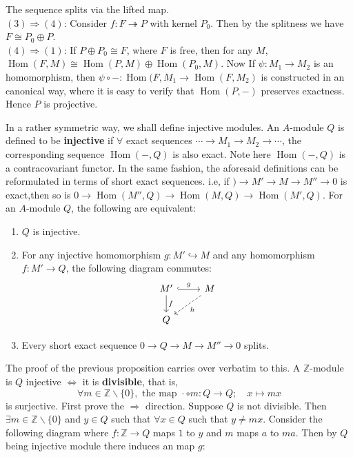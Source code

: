 \documentclass[12pt]{article}
\theoremstyle{definition}
\theoremstyle{plain}
\DeclareMathOperator{\Hom}{Hom}
\newcommand{\z}{\mathbb{Z}}
\newcommand{\inj}{\hookrightarrow}
\newcommand{\surj}{\twoheadrightarrow}
\begin{document}
The sequence splits via the lifted map.\\
$(3)\Rightarrow(4)$: Consider $f: F\surj P$ with kernel $P_0$. Then by the splitness we have $F\cong P_0\oplus P$.\\
$(4)\Rightarrow (1)$: If $P\oplus P_0\cong F$, where $F$ is free, then for any $M$, $\Hom(F, M)\cong \Hom(P, M)\oplus \Hom(P_0, M)$. Now If $\psi: M_1\to M_2$ is an homomorphism, then $\psi\circ -:\Hom(F, M_1\to \Hom(F, M_2)$ is constructed in an canonical way, where it is easy to verify that $\Hom(P, -)$ preserves exactness. Hence $P$ is projective.

\medskip
In a rather symmetric way, we shall define injective modules.
\Def An $A$-module $Q$ is defined to be \textbf{injective} if $\forall$ exact sequences $\cdots \to M_1\to M_2\to\cdots$, the corresponding sequence $\Hom(-, Q)$ is also exact. Note here $\Hom(-, Q)$ is a contracovariant functor.
\Rmk In the same fashion, the aforesaid definitions can be reformulated in terms of short exact sequences. i.e, if $)\to M'\to M\to M''\to 0$ is exact,then so is $0\to \Hom(M'', Q)\to \Hom(M, Q)\to \Hom(M', Q)$.
 For an $A$-module $Q$, the following are equivalent:
\begin{enumerate}
  \item $Q$ is injective.
  \item For any injective homomorphism $g: M'\inj M$ and any homomorphism $f: M'\to Q$, the following diagram commutes:
    \begin{equation}
      \begin{tikzcd}
        M'\ar{d}{f}\ar[hook]{r}{g} &M\ar[dashed]{ld}{h}\\
        Q
      \end{tikzcd}
    \end{equation}
  \item Every short exact sequence $0\to Q\to M\to M''\to 0$ splits.
\end{enumerate}
\proof The proof of the previous proposition carries over verbatim to this.
\Prop A $\z$-module is $Q$ injective $\iff$ it is \textbf{divisible}, that is, $$\forall m\in \z\backslash\{0\},\text{ the map }\cdot \circ m:Q\to Q; \quad x\mapsto mx $$is surjective.
\proof First prove the $\Rightarrow$ direction. Suppose $Q$ is not divisible. Then $\exists m\in \z\backslash\{0\}$ and $y\in Q$ such that $\forall x\in Q$ such that $y\neq mx$. Consider the following diagram where $f:\z\to Q$ maps $1$ to $y$ and $m$ maps $a$ to $ma$. Then by $Q$ being injective module there induces an map $g$:
\end{document}
